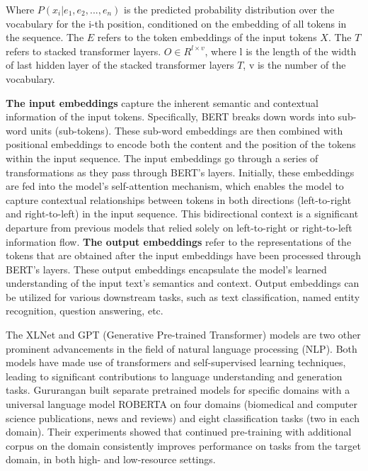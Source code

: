 \documentclass[]{ceurart}
\begin{document}
Where $P(x_i | e_1, e_2, ..., e_n)$ is the predicted probability distribution over the vocabulary for the i-th position, conditioned on the embedding of all tokens in the sequence. The $E$  refers to the token embeddings of the input tokens $X$. The $T$ refers to stacked transformer layers. $O \in R^{l \times v}$, where l is the length of the width of last hidden layer of the stacked transformer layers $T$, v is the number of the vocabulary.

\textbf{The input embeddings}  capture the inherent semantic and contextual information of the input tokens. Specifically, BERT breaks down words into sub-word units (sub-tokens). These sub-word embeddings are then combined with positional embeddings to encode both the content and the position of the tokens within the input sequence. The input embeddings go through a series of transformations as they pass through BERT's layers. Initially, these embeddings are fed into the model's self-attention mechanism, which enables the model to capture contextual relationships between tokens in both directions (left-to-right and right-to-left) in the input sequence. This bidirectional context is a significant departure from previous models that relied solely on left-to-right or right-to-left information flow.  \textbf{The output embeddings} refer to the representations of the tokens that are obtained after the input embeddings have been processed through BERT's layers. These output embeddings encapsulate the model's learned understanding of the input text's semantics and context. Output embeddings can be utilized for various downstream tasks, such as text classification, named entity recognition, question answering, etc. 

The XLNet \cite{yang_xlnet_2019} and GPT (Generative Pre-trained Transformer) \cite{brown_language_2020} models are two other prominent advancements in the field of natural language processing (NLP). Both models have made use of transformers and self-supervised learning techniques, leading to significant contributions to language understanding and generation tasks. Gururangan \cite{gururangan_dont_2020} built separate pretrained models for specific domains with a universal language model ROBERTA on four domains (biomedical and computer science publications, news and reviews) and eight classification tasks (two in each domain). Their experiments showed that continued pre-training with additional corpus on the domain consistently improves performance on tasks from the target domain, in both high- and low-resource settings.  
\end{document}

